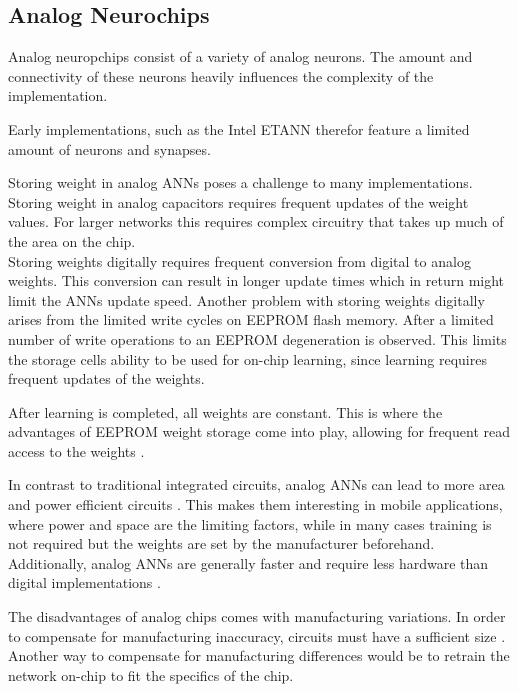 \documentclass[conference]{IEEEtran}
\begin{document}


    \subsection{Analog Neurochips}

    Analog neuropchips consist of a variety of analog neurons.
    The amount and connectivity of these neurons heavily influences the complexity of the implementation.

    Early implementations, such as the Intel ETANN therefor feature a limited amount of neurons and synapses.

    Storing weight in analog ANNs poses a challenge to many implementations.
    Storing weight in analog capacitors requires frequent updates of the weight values.
    For larger networks this requires complex circuitry that takes up much of the area on the chip.
    \\
    Storing weights digitally requires frequent conversion from digital to analog weights.
    This conversion can result in longer update times which in return might limit the ANNs update speed.
    Another problem with storing weights digitally arises from the limited write cycles on EEPROM flash memory.
    After a limited number of write operations to an EEPROM degeneration is observed.
    This limits the storage cells ability to be used for on-chip learning, since learning requires frequent updates of the weights.

    After learning is completed, all weights are constant.
    This is where the advantages of EEPROM weight storage come into play, allowing for frequent read access to the weights \cite{holler1989electrically}.


    In contrast to traditional integrated circuits, analog ANNs can lead to more area and power efficient circuits \cite{forssell2014hardware}.
    This makes them interesting in mobile applications, where power and space are the limiting factors, while in many cases training is not required but the weights are set by the manufacturer beforehand.
    Additionally, analog ANNs are generally faster and require less hardware than digital implementations \cite{hollis1990artificial}.

    The disadvantages of analog chips comes with manufacturing variations.
    In order to compensate for manufacturing inaccuracy, circuits must have a sufficient size \cite{forssell2014hardware}.
    Another way to compensate for manufacturing differences would be to retrain the network on-chip to fit the specifics of the chip.
\end{document}
